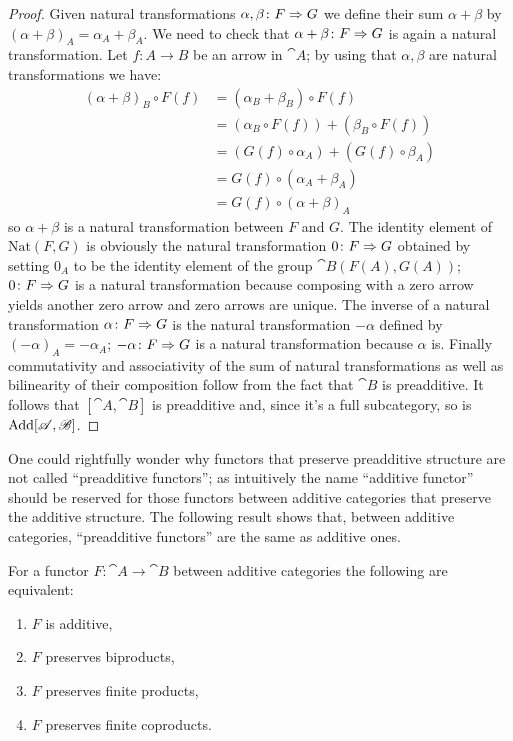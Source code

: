 \begin{proof}
  Given natural transformations \(\alpha,\beta\colon F\Rightarrow G\) we define their sum \(\alpha + \beta\) by \((\alpha+\beta)_A=\alpha_A+\beta_A\).
  We need to check that \(\alpha+\beta\colon F\Rightarrow G\) is again a natural transformation. Let \(f\colon A\to B\) be an arrow in \(\cat{A}\); by using that \(\alpha,\beta\) are natural transformations we have:
  \begin{align*}
    (\alpha+\beta)_B \circ F(f) &= (\alpha_B + \beta_B)\circ F(f)\\
                                &= (\alpha_B\circ F(f))+(\beta_B\circ F(f))\\
                                &= (G(f)\circ\alpha_A)+(G(f)\circ\beta_A)\\
                                &= G(f)\circ(\alpha_A+\beta_A)\\
                                &= G(f)\circ(\alpha+\beta)_A
  \end{align*}
  so \(\alpha+\beta\) is a natural transformation between \(F\) and \(G\).
  The identity element of \(\text{Nat}(F,G)\) is obviously the natural transformation \(0\colon F\Rightarrow G\) obtained by setting \(0_A\) to be the identity element of the group \(\cat{B}(F(A),G(A))\); \(0\colon F\Rightarrow G\) is a natural transformation because composing with a zero arrow yields another zero arrow and zero arrows are unique. The inverse of a natural transformation \(\alpha\colon F\Rightarrow G\) is the natural transformation \(-\alpha\) defined by \((-\alpha)_A = -\alpha_A\); \(-\alpha\colon F\Rightarrow G\) is a natural transformation because \(\alpha\) is.
  Finally commutativity and associativity of the sum of natural transformations as well as bilinearity of their composition follow from the fact that \(\cat{B}\) is preadditive. It follows that \([\cat{A}, \cat{B}]\) is preadditive and, since it's a full subcategory, so is \(\text{\normalfont Add}[{\mathscr A}, {\mathscr B}]\).
\end{proof}

One could rightfully wonder why functors that preserve preadditive structure are not called ``preadditive functors''; as intuitively the name ``additive functor'' should be reserved for those functors between additive categories that preserve the additive structure. The following result shows that, between additive categories, ``preadditive functors'' are the same as additive ones.

\begin{proposition}
  \label{prop:additive_criteria}
  For a functor \(F\colon\cat{A}\to\cat{B}\) between additive categories the following are equivalent:
  \begin{enumerate}[label=(\arabic*)]
  \item \(F\) is additive,
  \item \(F\) preserves biproducts,
  \item \(F\) preserves finite products,
  \item \(F\) preserves finite coproducts.
  \end{enumerate}
\end{proposition}


